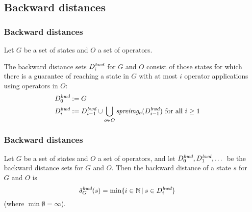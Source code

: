 \documentclass{gkibeamer}
\begin{document}
\subsection{Backward distances}

\begin{frame}
  \frametitle{Backward distances}

  \begin{definition}
    Let $G$ be a set of states and $O$ a set of operators.
    
    The \alert{backward distance sets} $D^{\ms{bwd}}_i$ for $G$ and
    $O$ consist of those states for which there is a guarantee of
    reaching a state in $G$ with at most $i$ operator applications
    using operators in $O$:
    \begin{align*}
      D^{\ms{bwd}}_0 & := G \\
      D^{\ms{bwd}}_i & := D^{\ms{bwd}}_{i-1} \cup
      \bigcup_{o \in O} \spreimage{o}{D^{\ms{bwd}}_{i - 1}}
      \text{~for all~} i \ge 1
    \end{align*}
  \end{definition}
\end{frame}

\begin{frame}
  \frametitle{Backward distances}

  \begin{definition}
    Let $G$ be a set of states and $O$ a set of operators, and
    let $D^{\ms{bwd}}_0, D^{\ms{bwd}}_1, \dots$ be the backward
    distance sets for $G$ and $O$. Then the \alert{backward distance}
    of a state $s$ for $G$ and $O$ is
    \[
    \disbwd{G}{s} = \min \{ i \in \mathbb N \,|\, s \in D^{\ms{bwd}}_i \}
    \]
    (where $\min\emptyset = \infty$).
  \end{definition}
\end{frame}
\end{document}
